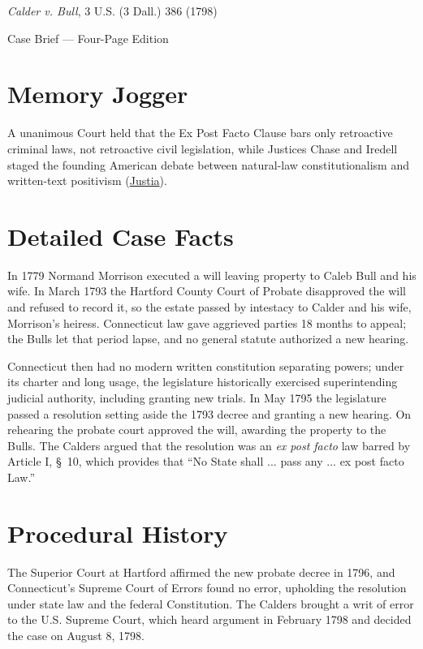 \documentclass[12pt]{article}
\begin{document}
\begin{center}
{\LARGE \textit{Calder v. Bull}, 3 U.S. (3 Dall.) 386 (1798)\par}
\vspace{0.8em}
{\large Case Brief --- Four-Page Edition\par}
\end{center}
\vspace{1em}

\section{Memory Jogger}

A unanimous Court held that the Ex Post Facto Clause bars only retroactive criminal laws, not retroactive civil legislation, while Justices Chase and Iredell staged the founding American debate between natural-law constitutionalism and written-text positivism (\href{https://supreme.justia.com/cases/federal/us/3/386/}{Justia}).

\section{Detailed Case Facts}

In 1779 Normand Morrison executed a will leaving property to Caleb Bull and his wife. In March 1793 the Hartford County Court of Probate disapproved the will and refused to record it, so the estate passed by intestacy to Calder and his wife, Morrison's heiress. Connecticut law gave aggrieved parties 18 months to appeal; the Bulls let that period lapse, and no general statute authorized a new hearing.

Connecticut then had no modern written constitution separating powers; under its charter and long usage, the legislature historically exercised superintending judicial authority, including granting new trials. In May 1795 the legislature passed a resolution setting aside the 1793 decree and granting a new hearing. On rehearing the probate court approved the will, awarding the property to the Bulls. The Calders argued that the resolution was an \textit{ex post facto} law barred by Article I, \S~10, which provides that ``No State shall ... pass any ... ex post facto Law.''

\section{Procedural History}

The Superior Court at Hartford affirmed the new probate decree in 1796, and Connecticut's Supreme Court of Errors found no error, upholding the resolution under state law and the federal Constitution. The Calders brought a writ of error to the U.S. Supreme Court, which heard argument in February 1798 and decided the case on August 8, 1798.
\end{document}

